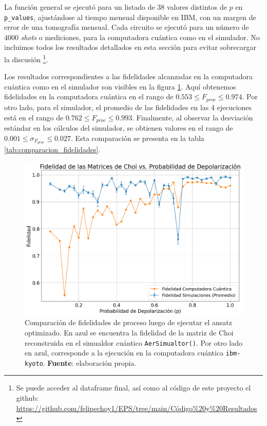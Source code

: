 \documentclass[letterpaper,12pt]{thesisECFM}
\theoremstyle{plain}
\theoremstyle{definition}
\theoremstyle{remark}
\newcommand{\1}{\mathbb{1}}
\begin{document}
La función general se ejecutó para un listado de 38 valores distintos de $p$ en \texttt{p\_values}, ajustándose al tiempo mensual disponible en IBM, con un margen de error de una tomografía mensual. Cada circuito se ejecutó para un número de 4000 \textit{shots} o mediciones, para la computadora cuántica como en el simulador. No incluimos todos los resultados detallados en esta sección para evitar sobrecargar la discusión \footnote{Se puede acceder al dataframe final, así como al código de este proyecto el github: \href{https://github.com/felipechoy1/EPS/tree/main/Código\%20y\%20Resultados}{https://github.com/felipechoy1/EPS/tree/main/Código\%20y\%20Resultados}}.

Los resultados correspondientes a las fidelidades alcanzadas en la computadora cuántica como en el simulador son visibles en la figura \ref{fig:comparacion_fidelidad}. Aquí obtenemos fidelidades en la computadora cuántica en el rango de $0.553\leq F_{proc} \leq 0.974$. Por otro lado, para el simulador, el promedio de las fidelidades en las 4 ejecuciones está en el rango de $0.762\leq F_{proc} \leq 0.993$. Finalmente, al observar la desviación estándar en los cálculos del simulador, se obtienen valores en el rango de $0.001\leq \sigma_{F_{proc}} \leq 0.027$. Esta comparación se presenta en la tabla \ref{tab:comparacion_fidelidades}.



\begin{figure}[h!] 
    \centering 
    \includegraphics[width=0.7\linewidth]{imagenes/comparacion fidelidad.png}
    \caption{Comparación de fidelidades de proceso luego de ejecutar el ansatz optimizado. En azul se encuentra la fidelidad de la matriz de Choi reconstruida en el simualdor cuántico \texttt{AerSimualtor()}. Por otro lado en azul, corresponde a la ejecución en la computadora cuántica \texttt{ibm-kyoto}. \textbf{Fuente}: elaboración propia. }
    \label{fig:comparacion_fidelidad}
    \end{figure}
    
\end{document}
